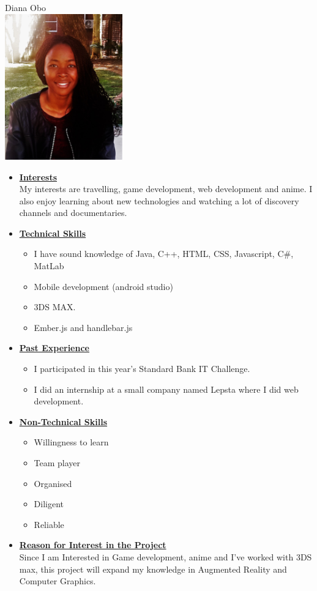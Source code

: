 \documentclass[a4paper,12pt]{article}
\begin{document}
\begin{center}
{\Large Diana {Obo}} \\[0.3cm]
\includegraphics[width= 2in]{Diana.jpg}\\[0.4cm] 
\end{center}

\begin{itemize}
\item {\large \underline{\textbf{Interests}}}\\[0.2cm]
My interests are travelling, game development, web development and anime. I also enjoy learning about new technologies and watching a lot of discovery channels and documentaries.

\item {\large \underline{\textbf{Technical Skills}}}
	\begin{itemize}
		\item I have sound knowledge of Java, C++, HTML, CSS, Javascript, C\#, MatLab
		\item Mobile development (android studio) 
		\item 3DS MAX.
		\item Ember.js and  handlebar.js
	\end{itemize}
\bigskip
\item {\large \underline{\textbf{Past Experience}}}
\begin{itemize}
\item I participated in this year's Standard Bank IT Challenge.
\item I did an internship at a small company named Lepsta where I did web development.
\end{itemize}
\bigskip
\item {\large \underline{\textbf{Non-Technical Skills}}}
\begin{itemize}
\item Willingness to learn
\item Team player
\item Organised
\item Diligent
\item Reliable
\end{itemize}
\bigskip
\item {\large \underline{\textbf{Reason for Interest in the Project}}}\\[0.2cm]
Since I am Interested in Game development, anime and I’ve worked with 3DS max, this project will expand my knowledge in Augmented Reality and Computer Graphics.

\end{itemize}
\end{document}
